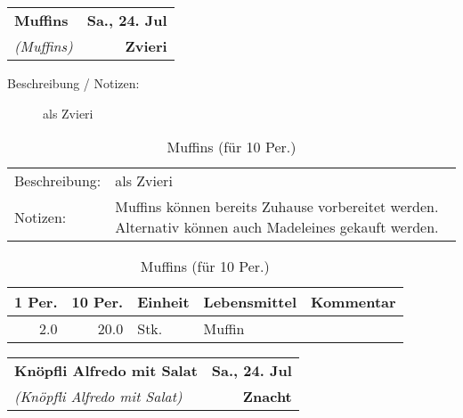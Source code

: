 \documentclass[11pt,a4paper]{article}%
\begin{document}
%
\clearpage%
\pagebreak%
\renewcommand{\arraystretch}{1.75}%
%
%


\begin{table}%
\begin{tabularx}{\textwidth}{X r}%
\LARGE \textbf{Muffins}&\color{gray} \large \textbf{Sa., 24. Jul}\\%
\small \textit{(Muffins)}&\color{gray} \large \textbf{Zvieri}\\%
\hline%
\end{tabularx}%
\end{table}

%
\begin{description}%
\item[Beschreibung / Notizen:]%
als Zvieri%
\end{description}%
\vspace{0.75cm}%
\renewcommand{\arraystretch}{1.25}%


\begin{table}[h]%
\caption{Muffins (für 10 Per.)}%
\begin{tabularx}{\textwidth}{l X}%
Beschreibung: &als Zvieri\\%
Notizen:&Muffins können bereits Zuhause vorbereitet werden. Alternativ können auch Madeleines gekauft werden.\\%
\end{tabularx}%
\par%
\begin{tabularx}{\textwidth}{| r | r | l | l | X |}%
\hline%
\tiny{1 Per.}&\tiny{10 Per.}&\tiny{Einheit}&\tiny{Lebensmittel}&\tiny{Kommentar}\\%
\hline%
2.0&20.0&Stk.&Muffin&\\%
\hline%
\end{tabularx}%
\end{table}

%
\clearpage%
\pagebreak%
\renewcommand{\arraystretch}{1.75}%
%
%


\begin{table}%
\begin{tabularx}{\textwidth}{X r}%
\LARGE \textbf{Knöpfli Alfredo mit Salat}&\color{gray} \large \textbf{Sa., 24. Jul}\\%
\small \textit{(Knöpfli Alfredo mit Salat)}&\color{gray} \large \textbf{Znacht}\\%
\hline%
\end{tabularx}%
\end{table}
\end{document}
